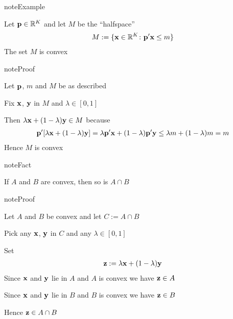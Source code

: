\documentclass[letterpaper,10pt,english]{jupyterBook}
\begin{document}
\begin{sphinxadmonition}{note}{Example}

\sphinxAtStartPar
Let \({\bf p} \in \mathbb{R}^K\) and let \(M\) be the “half\sphinxhyphen{}space”
\begin{equation*}
\begin{split}
%
M := \{ {\bf x} \in \mathbb{R}^K \colon {\bf p }' {\bf x} \leq m\}
%
\end{split}
\end{equation*}
\sphinxAtStartPar
The set \(M\) is convex
\end{sphinxadmonition}

\begin{sphinxadmonition}{note}{Proof}

\sphinxAtStartPar
Let \({\bf p}\), \(m\) and \(M\) be as described

\sphinxAtStartPar
Fix \({\bf x}\), \({\bf y}\) in \(M\) and \(\lambda \in [0, 1]\)

\sphinxAtStartPar
Then \(\lambda {\bf x} + (1 - \lambda) {\bf y} \in M\) because
\begin{equation*}
\begin{split}
%
{\bf p}'[\lambda {\bf x} + (1 - \lambda) {\bf y} ] =
\lambda {\bf p}'{\bf x} + (1 - \lambda) {\bf p}'{\bf y} 
\leq \lambda m + (1 - \lambda) m
= m
%
\end{split}
\end{equation*}
\sphinxAtStartPar
Hence \(M\) is convex
\end{sphinxadmonition}

\begin{sphinxadmonition}{note}{Fact}

\sphinxAtStartPar
If \(A\) and \(B\) are convex, then so is \(A \cap B\)
\end{sphinxadmonition}

\begin{sphinxadmonition}{note}{Proof}

\sphinxAtStartPar
Let \(A\) and \(B\) be convex and let \(C := A \cap B\)

\sphinxAtStartPar
Pick any \({\bf x}\), \({\bf y}\) in \(C\) and any \(\lambda \in [0, 1]\)

\sphinxAtStartPar
Set
\begin{equation*}
\begin{split}{\bf z} := \lambda {\bf x} + (1 - \lambda) {\bf y}\end{split}
\end{equation*}
\sphinxAtStartPar
Since \({\bf x}\) and \({\bf y}\) lie in \(A\) and \(A\) is convex we have \({\bf z}
\in A\)

\sphinxAtStartPar
Since \({\bf x}\) and \({\bf y}\) lie in \(B\) and \(B\) is convex we have \({\bf z}
\in B\)

\sphinxAtStartPar
Hence \({\bf z} \in A \cap B\)
\end{sphinxadmonition}
\end{document}
